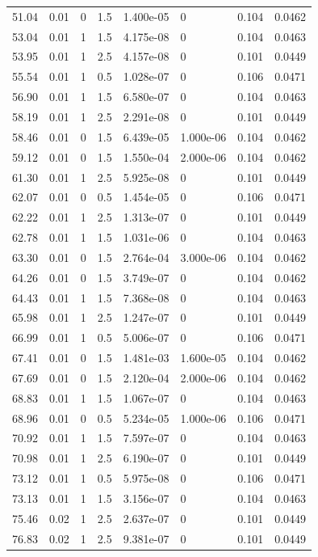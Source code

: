 \documentclass[preview]{standalone}
\begin{document}
{{{\begin{tabular}{L{1.2cm}C{1.2cm} C{0.3cm}C{0.5cm} C{1.4cm}C{1.4cm} C{1.4cm}C{1.4cm}}
  51.04  &  0.01  & 0     & 1.5 &  1.400e-05  & 0  & 0.104 &  0.0462   \\ 
  53.04  &  0.01  & 1     & 1.5 &  4.175e-08  & 0  & 0.104 &  0.0463   \\ 
  53.95  &  0.01  & 1     & 2.5 &  4.157e-08  & 0  & 0.101 &  0.0449   \\ 
  55.54  &  0.01  & 1     & 0.5 &  1.028e-07  & 0  & 0.106 &  0.0471   \\ 
  56.90  &  0.01  & 1     & 1.5 &  6.580e-07  & 0  & 0.104 &  0.0463   \\ 
  58.19  &  0.01  & 1     & 2.5 &  2.291e-08  & 0  & 0.101 &  0.0449   \\ 
  58.46  &  0.01  & 0     & 1.5 &  6.439e-05  & 1.000e-06  & 0.104 &  0.0462   \\ 
  59.12  &  0.01  & 0     & 1.5 &  1.550e-04  & 2.000e-06  & 0.104 &  0.0462   \\ 
  61.30  &  0.01  & 1     & 2.5 &  5.925e-08  & 0  & 0.101 &  0.0449   \\ 
  62.07  &  0.01  & 0     & 0.5 &  1.454e-05  & 0  & 0.106 &  0.0471   \\ 
  62.22  &  0.01  & 1     & 2.5 &  1.313e-07  & 0  & 0.101 &  0.0449   \\ 
  62.78  &  0.01  & 1     & 1.5 &  1.031e-06  & 0  & 0.104 &  0.0463   \\ 
  63.30  &  0.01  & 0     & 1.5 &  2.764e-04  & 3.000e-06  & 0.104 &  0.0462   \\ 
  64.26  &  0.01  & 0     & 1.5 &  3.749e-07  & 0  & 0.104 &  0.0462   \\ 
  64.43  &  0.01  & 1     & 1.5 &  7.368e-08  & 0  & 0.104 &  0.0463   \\ 
  65.98  &  0.01  & 1     & 2.5 &  1.247e-07  & 0  & 0.101 &  0.0449   \\ 
  66.99  &  0.01  & 1     & 0.5 &  5.006e-07  & 0  & 0.106 &  0.0471   \\ 
  67.41  &  0.01  & 0     & 1.5 &  1.481e-03  & 1.600e-05  & 0.104 &  0.0462   \\ 
  67.69  &  0.01  & 0     & 1.5 &  2.120e-04  & 2.000e-06  & 0.104 &  0.0462   \\ 
  68.83  &  0.01  & 1     & 1.5 &  1.067e-07  & 0  & 0.104 &  0.0463   \\ 
  68.96  &  0.01  & 0     & 0.5 &  5.234e-05  & 1.000e-06  & 0.106 &  0.0471   \\ 
  70.92  &  0.01  & 1     & 1.5 &  7.597e-07  & 0  & 0.104 &  0.0463   \\ 
  70.98  &  0.01  & 1     & 2.5 &  6.190e-07  & 0  & 0.101 &  0.0449   \\ 
  73.12  &  0.01  & 1     & 0.5 &  5.975e-08  & 0  & 0.106 &  0.0471   \\ 
  73.13  &  0.01  & 1     & 1.5 &  3.156e-07  & 0  & 0.104 &  0.0463   \\ 
  75.46  &  0.02  & 1     & 2.5 &  2.637e-07  & 0  & 0.101 &  0.0449   \\ 
  76.83  &  0.02  & 1     & 2.5 &  9.381e-07  & 0  & 0.101 &  0.0449   \\ 
\hline 
\end{tabular} 

}}}
\end{document}
